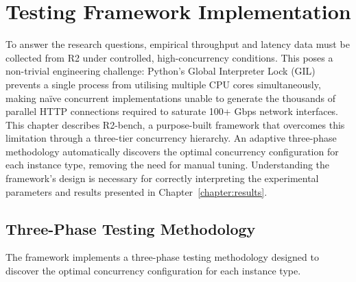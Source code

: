 
\chapter{Testing Framework Implementation}\label{chapter:framework}

To answer the research questions, empirical throughput and latency data must be collected from R2 under controlled, high-concurrency conditions. This poses a non-trivial engineering challenge: Python's Global Interpreter Lock (GIL) prevents a single process from utilising multiple CPU cores simultaneously, making na\"ive concurrent implementations unable to generate the thousands of parallel HTTP connections required to saturate 100+ Gbps network interfaces. This chapter describes R2-bench, a purpose-built framework that overcomes this limitation through a three-tier concurrency hierarchy. An adaptive three-phase methodology automatically discovers the optimal concurrency configuration for each instance type, removing the need for manual tuning. Understanding the framework's design is necessary for correctly interpreting the experimental parameters and results presented in Chapter~\ref{chapter:results}.

\section{Three-Phase Testing Methodology}\label{sec:phases}

The framework implements a three-phase testing methodology designed to discover the optimal concurrency configuration for each instance type.

